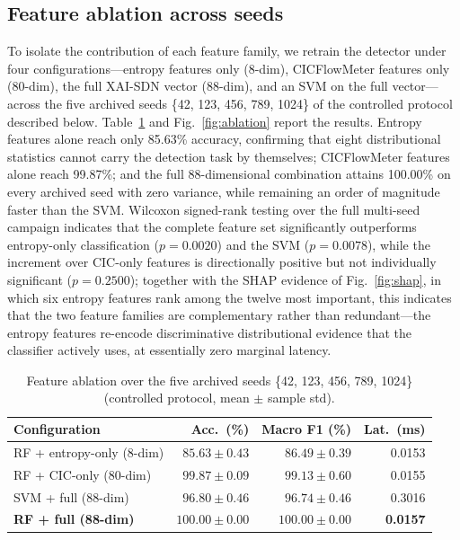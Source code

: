 ﻿\documentclass[review,12pt]{elsarticle}
\begin{document}
\subsection{Feature ablation across seeds}
To isolate the contribution of each feature family, we retrain the detector under four configurations---entropy features only (8-dim), CICFlowMeter features only (80-dim), the full XAI-SDN vector (88-dim), and an SVM on the full vector---across the five archived seeds \{42, 123, 456, 789, 1024\} of the controlled protocol described below. Table~\ref{tab:ablation} and Fig.~\ref{fig:ablation} report the results. Entropy features alone reach only 85.63\% accuracy, confirming that eight distributional statistics cannot carry the detection task by themselves; CICFlowMeter features alone reach 99.87\%; and the full 88-dimensional combination attains 100.00\% on every archived seed with zero variance, while remaining an order of magnitude faster than the SVM. Wilcoxon signed-rank testing over the full multi-seed campaign indicates that the complete feature set significantly outperforms entropy-only classification ($p=0.0020$) and the SVM ($p=0.0078$), while the increment over CIC-only features is directionally positive but not individually significant ($p=0.2500$); together with the SHAP evidence of Fig.~\ref{fig:shap}, in which six entropy features rank among the twelve most important, this indicates that the two feature families are complementary rather than redundant---the entropy features re-encode discriminative distributional evidence that the classifier actively uses, at essentially zero marginal latency.

\begin{table}[!t]
\centering
\caption{Feature ablation over the five archived seeds \{42, 123, 456, 789, 1024\} (controlled protocol, mean $\pm$ sample std).}
\label{tab:ablation}
\small
\setlength{\tabcolsep}{3.5pt}
\begin{tabular}{@{}lrrr@{}}
\toprule
\textbf{Configuration} & \textbf{Acc.\ (\%)} & \textbf{Macro F1 (\%)} & \textbf{Lat.\ (ms)} \\
\midrule
RF + entropy-only (8-dim) & $85.63 \pm 0.43$ & $86.49 \pm 0.39$ & 0.0153 \\
RF + CIC-only (80-dim) & $99.87 \pm 0.09$ & $99.13 \pm 0.60$ & 0.0155 \\
SVM + full (88-dim) & $96.80 \pm 0.46$ & $96.74 \pm 0.46$ & 0.3016 \\
\textbf{RF + full (88-dim)} & $\mathbf{100.00 \pm 0.00}$ & $\mathbf{100.00 \pm 0.00}$ & \textbf{0.0157} \\
\bottomrule
\end{tabular}
\end{table}
\end{document}
